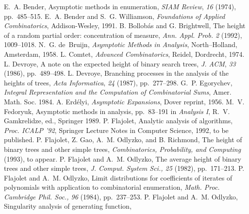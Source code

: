 \begin{thebibliography}{99}
E.~A. Bender,
Asymptotic methods in enumeration,
{\em SIAM Review},
{\em 16} (1974),
pp.~485--515.
E.~A. Bender
and S.~G. Williamson,
{\em Foundations of Applied Combinatorics},
Addison-Wesley, 1991.
B. Bollob\'{a}s and G. Brightwell,
The height of a random partial order:
concentration of measure, {\em Ann. Appl. Prob. 2} (1992), 1009--1018.
N.~G. de~Bruijn,
{\em Asymptotic Methods in Analysis},
North--Holland, Amsterdam, 1958.
L. Comtet,
{\em Advanced Combinatorics},
Reidel, Dordrecht, 1974.
L. Devroye,
A note on the expected height of binary search trees,
{\em J. ACM},
{\em 33}
(1986),
pp.~489--498.
L. Devroye,
Branching processes in the analysis of the heights of trees,
{\em Acta Informatica},
{\em 24}
(1987),
pp.~277--298.
G.~P. Egorychev,
{\em Integral Representation and the Computation of Combinatorial Sums},
Amer. Math. Soc. 1984.
A. Erd{\'e}lyi,
{\em Asymptotic Expansions}, Dover reprint, 1956.
M.~V. Fedoryuk,
Asymptotic methods in analysis, pp.~83--191 in
{\em Analysis I},
R.~V. Gamkrelidze, ed., Springer 1989.
P. Flajolet,
Analytic analysis of algorithms,
{\em Proc. ICALP '92}, Springer Lecture Notes in Computer Science, 1992, to be published.
P. Flajolet, Z. Gao,
A.~M. Odlyzko,
and B. Richmond,
The height of binary trees and other simple trees,
{\em Combinatorics, Probability, and Computing} (1993), to appear.
P. Flajolet and A.~M. Odlyzko,
The average height of binary trees and other simple trees,
{\em J. Comput. System Sci., 25} (1982), pp.~171--213.
P. Flajolet and A.~M. Odlyzko,
Limit distributions for coefficients of iterates of
polynomials with application
to combinatorial enumeration,
{\em Math. Proc. Cambridge Phil. Soc., 96} (1984), pp.~237--253.
P. Flajolet and A.~M. Odlyzko,
Singularity analysis of generating function,

\end{thebibliography}
